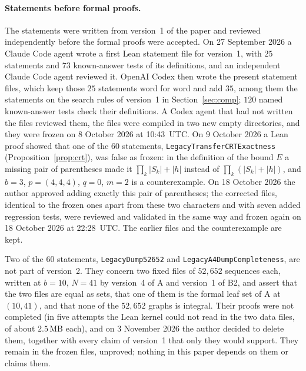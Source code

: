 \documentclass[11pt]{article}
\theoremstyle{definition}
\theoremstyle{remark}
\begin{document}
\paragraph{Statements before formal proofs.}
The statements were written from version~1 of the paper and reviewed
independently before the formal proofs were accepted. On 27 September 2026 a
Claude Code agent wrote a first Lean statement file for version~1, with $25$
statements and $73$ known-answer tests of its definitions, and an independent
Claude Code agent reviewed it. OpenAI Codex then wrote the present statement
files, which keep those $25$ statements word for word and add $35$, among
them the statements on the search rules of version~1 in
Section~\ref{sec:comp}; $120$ named known-answer tests check their
definitions. A Codex agent that had not written the files reviewed them, the files
were compiled in two new empty directories, and they were frozen on
8 October 2026 at 10:43~UTC. On 9 October 2026 a Lean proof showed that one of
the $60$ statements, \texttt{LegacyTransferCRTExactness}
(Proposition~\ref{prop:crt}), was false as frozen: in the definition of the
bound $E$ a missing pair of parentheses made it $\prod_k|S_k|+|h|$ instead of
$\prod_k(|S_k|+|h|)$, and $b=3$, $p=(4,4,4)$, $q=0$, $m=2$ is a
counterexample. On 18 October 2026 the author approved adding exactly this
pair of parentheses; the corrected files, identical to the frozen ones apart
from these two characters and with seven added regression tests, were
reviewed and validated in the same way and frozen again on 18 October 2026 at
22:28~UTC. The earlier files and the counterexample are kept.

Two of the $60$ statements, \texttt{LegacyDump52652} and
\texttt{LegacyA4DumpCompleteness}, are not part of version~2. They concern
two fixed files of $52{,}652$ sequences each, written at $b=10$, $N=41$ by
version~4 of A and version~1 of B2, and assert that the two files are equal
as sets, that one of them is the formal leaf set of A at $(10,41)$, and that
none of the $52{,}652$ graphs is integral. Their proofs were not completed (in
five attempts the Lean kernel could not read in the two data files, of about
$2.5$\,MB each), and on 3 November 2026 the author decided to delete them,
together with every claim of version~1 that only they would support. They
remain in the frozen files, unproved; nothing in this paper depends on them or
claims them.
\end{document}
